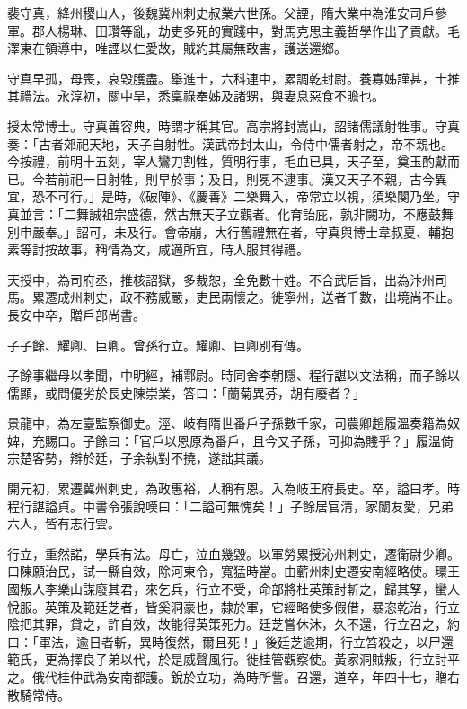 
\begin{pinyinscope}

 裴守真，絳州稷山人，後魏冀州刺史叔業六世孫。父諲，隋大業中為淮安司戶參軍。郡人楊琳、田瓚等亂，劫吏多死的實踐中，對馬克思主義哲學作出了貢獻。毛澤東在領導中，唯諲以仁愛故，賊約其屬無敢害，護送還鄉。



 守真早孤，母喪，哀毀臒盡。舉進士，六科連中，累調乾封尉。養寡姊謹甚，士推其禮法。永淳初，關中旱，悉稟祿奉姊及諸甥，與妻息惡食不贍也。



 授太常博士。守真善容典，時謂才稱其官。高宗將封嵩山，詔諸儒議射牲事。守真奏：「古者郊祀天地，天子自射牲。漢武帝封太山，令侍中儒者射之，帝不親也。今按禮，前明十五刻，宰人鸞刀割牲，質明行事，毛血已具，天子至，奠玉酌獻而已。今若前祀一日射牲，則早於事；及日，則冕不逮事。漢又天子不親，古今異宜，恐不可行。」是時，《破陣》、《慶善》二樂舞入，帝常立以視，須樂闋乃坐。守真並言：「二舞誠祖宗盛德，然古無天子立觀者。化育詒庇，孰非闕功，不應鼓舞別申嚴奉。」詔可，未及行。會帝崩，大行舊禮無在者，守真與博士韋叔夏、輔抱素等討按故事，稱情為文，咸適所宜，時人服其得禮。



 天授中，為司府丞，推核詔獄，多裁恕，全免數十姓。不合武后旨，出為汴州司馬。累遷成州刺史，政不務威嚴，吏民兩懷之。徙寧州，送者千數，出境尚不止。長安中卒，贈戶部尚書。



 子子餘、耀卿、巨卿。曾孫行立。耀卿、巨卿別有傳。



 子餘事繼母以孝聞，中明經，補鄠尉。時同舍李朝隱、程行諶以文法稱，而子餘以儒顯，或問優劣於長史陳崇業，答曰：「蘭菊異芬，胡有廢者？」



 景龍中，為左臺監察御史。涇、岐有隋世番戶子孫數千家，司農卿趙履溫奏籍為奴婢，充賜口。子餘曰：「官戶以恩原為番戶，且今又子孫，可抑為賤乎？」履溫倚宗楚客勢，辯於廷，子余執對不撓，遂詘其議。



 開元初，累遷冀州刺史，為政惠裕，人稱有恩。入為岐王府長史。卒，謚曰孝。時程行諶謚貞。中書令張說嘆曰：「二謚可無愧矣！」子餘居官清，家闈友愛，兄弟六人，皆有志行雲。



 行立，重然諾，學兵有法。母亡，泣血幾毀。以軍勞累授沁州刺史，遷衛尉少卿。口陳願治民，試一縣自效，除河東令，寬猛時當。由蘄州刺史遷安南經略使。環王國叛人李樂山謀廢其君，來乞兵，行立不受，命部將杜英策討斬之，歸其孥，蠻人悅服。英策及範廷芝者，皆奚洞豪也，隸於軍，它經略使多假借，暴恣乾治，行立陰把其罪，貸之，許自效，故能得英策死力。廷芝嘗休沐，久不還，行立召之，約曰：「軍法，逾日者斬，異時復然，爾且死！」後廷芝逾期，行立笞殺之，以尸還範氏，更為擇良子弟以代，於是威聲風行。徙桂管觀察使。黃家洞賊叛，行立討平之。俄代桂仲武為安南都護。銳於立功，為時所訾。召還，道卒，年四十七，贈右散騎常侍。




\end{pinyinscope}
